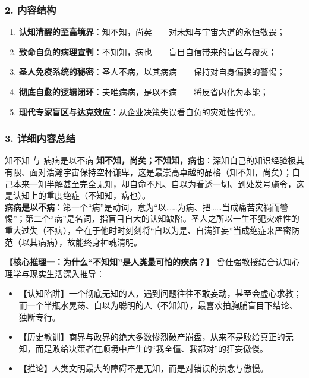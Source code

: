 \subsubsection{2. 内容结构}
\begin{enumerate}
    \item \textbf{认知清醒的至高境界}：知不知，尚矣——对未知与宇宙大道的永恒敬畏；
    \item \textbf{致命自负的病理宣判}：不知知，病也——盲目自信带来的盲区与覆灭；
    \item \textbf{圣人免疫系统的秘密}：圣人不病，以其病病——保持对自身偏狭的警惕；
    \item \textbf{彻底自愈的逻辑闭环}：夫唯病病，是以不病——将反省内化为本能；
    \item \textbf{现代专家盲区与达克效应}：从企业决策失误看自负的灾难性代价。
\end{enumerate}

\subsubsection{3. 详细内容总结}

\begin{ConceptBox}{知不知 与 病病是以不病}
\textbf{知不知，尚矣；不知知，病也}：深知自己的知识经验极其有限、面对浩瀚宇宙保持空杯谦卑，这是最崇高卓越的品格（知不知，尚矣）；自己本来一知半解甚至完全无知，却自命不凡、自以为看透一切、到处发号施令，这是认知上的重度绝症（不知知，病也）。\\
\textbf{病病是以不病}：第一个“病”是动词，意为“以……为病、把……当成痛苦灾祸而警惕”；第二个“病”是名词，指盲目自大的认知缺陷。圣人之所以一生不犯灾难性的重大过失（不病），全在于他时时刻刻将“自以为是、自满狂妄”当成绝症来严密防范（以其病病），故能终身神魂清明。
\end{ConceptBox}

\noindent\textbf{【核心推理一：为什么“不知知”是人类最可怕的疾病？】}
曾仕强教授结合认知心理学与现实生活深入推导：
\begin{itemize}
    \item 【认知陷阱】一个彻底无知的人，遇到问题往往不敢妄动，甚至会虚心求教；而一个半瓶水晃荡、自以为聪明的人（不知知），最喜欢拍胸脯盲目下结论、独断专行。
    \item 【历史教训】商界与政界的绝大多数惨烈破产崩盘，从来不是败给真正的无知，而是败给决策者在顺境中产生的“我全懂、我都对”的狂妄傲慢。
    \item 【推论】人类文明最大的障碍不是无知，而是对错误的执念与傲慢。
\end{itemize}

